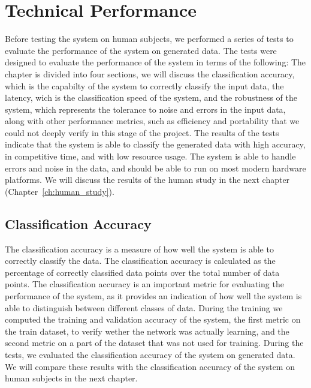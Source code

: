 \chapter{Technical Performance}\label{ch:testing}
Before testing the system on human subjects, we performed a series of tests to evaluate the performance of the system on generated data. 
The tests were designed to evaluate the performance of the system in terms of the following:
The chapter is divided into four sections, we will discuss the classification accuracy, which is the capabilty of the system to correctly classify the input data, the latency, wich is the classification speed of the system, and the robustness of the system, which represents the tolerance to noise and errors in the input data, along with other performance metrics, such as efficiency and portability that we could not deeply verify in this stage of the project.
The results of the tests indicate that the system is able to classify the generated data with high accuracy, in competitive time, and with low resource usage.
The system is able to handle errors and noise in the data, and should be able to run on most modern hardware platforms.
We will discuss the results of the human study in the next chapter (Chapter~\ref{ch:human_study}).

\section{Classification Accuracy}
The classification accuracy is a measure of how well the system is able to correctly classify the data.
The classification accuracy is calculated as the percentage of correctly classified data points over the total number of data points.
The classification accuracy is an important metric for evaluating the performance of the system, as it provides an indication of how well the system is able to distinguish between different classes of data.
During the training we computed the training and validation accuracy of the system, the first metric on the train dataset, to verify wether the network was actually learning, and the second metric on a part of the dataset that was not used for training.
During the tests, we evaluated the classification accuracy of the system on generated data.
We will compare these results with the classification accuracy of the system on human subjects in the next chapter.

